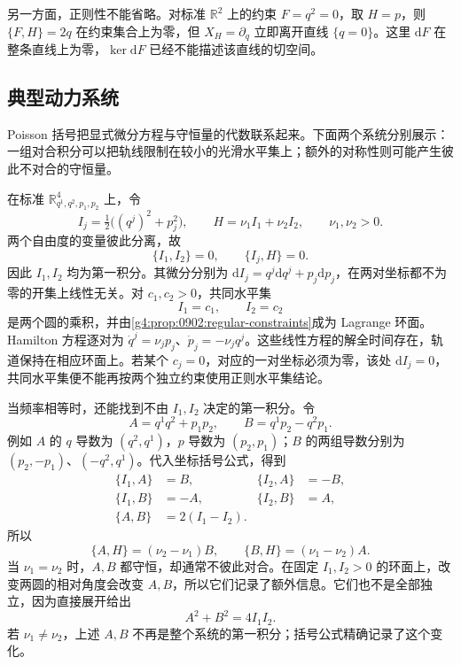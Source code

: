 \ProseParagraphBreak

另一方面，正则性不能省略。对标准 \(\mathbb R^2\) 上的约束 \(F=q^2=0\)，取 \(H=p\)，则 \(\{F,H\}=2q\) 在约束集合上为零，但 \(X_H=\partial_q\) 立即离开直线 \(\{q=0\}\)。这里 \(\mathrm{d}F\) 在整条直线上为零，\(\ker\mathrm{d}F\) 已经不能描述该直线的切空间。

\subsection{典型动力系统}
\label{g4:subsec:0902:04}

Poisson 括号把显式微分方程与守恒量的代数联系起来。下面两个系统分别展示：一组对合积分可以把轨线限制在较小的光滑水平集上；额外的对称性则可能产生彼此不对合的守恒量。

\begin{example}\label{g4:exm:0902:two-oscillators}
	在标准 \(\mathbb R^4_{q^1,q^2,p_1,p_2}\) 上，令
	\[
		I_j=\tfrac12\bigl((q^j)^2+p_j^2\bigr),\qquad
		H=\nu_1I_1+\nu_2I_2,\qquad \nu_1,\nu_2>0.
	\]
	两个自由度的变量彼此分离，故
	\[
		\{I_1,I_2\}=0,\qquad \{I_j,H\}=0.
	\]
	因此 \(I_1,I_2\) 均为第一积分。其微分分别为
	\(\mathrm{d}I_j=q^j\mathrm{d}q^j+p_j\mathrm{d}p_j\)，在两对坐标都不为零的开集上线性无关。对 \(c_1,c_2>0\)，共同水平集
	\[
		I_1=c_1,\qquad I_2=c_2
	\]
	是两个圆的乘积，并由\cref{g4:prop:0902:regular-constraints}成为 Lagrange 环面。Hamilton 方程逐对为
	\(\dot q^j=\nu_jp_j\)、\(\dot p_j=-\nu_jq^j\)。这些线性方程的解全时间存在，轨道保持在相应环面上。若某个 \(c_j=0\)，对应的一对坐标必须为零，该处 \(\mathrm{d}I_j=0\)，共同水平集便不能再按两个独立约束使用正则水平集结论。

	当频率相等时，还能找到不由 \(I_1,I_2\) 决定的第一积分。令
	\[
		A=q^1q^2+p_1p_2,\qquad
		B=q^1p_2-q^2p_1.
	\]
	例如 \(A\) 的 \(q\) 导数为 \((q^2,q^1)\)，\(p\) 导数为 \((p_2,p_1)\)；\(B\) 的两组导数分别为 \((p_2,-p_1)\)、\((-q^2,q^1)\)。代入坐标括号公式，得到
	\begin{equation}\label{g4:eq:0902:oscillator-brackets}
		\begin{aligned}
			\{I_1,A\}&=B,& \{I_2,A\}&=-B,\\
			\{I_1,B\}&=-A,& \{I_2,B\}&=A,\\
			\{A,B\}&=2(I_1-I_2).
		\end{aligned}
	\end{equation}
	所以
	\[
		\{A,H\}=(\nu_2-\nu_1)B,\qquad
		\{B,H\}=(\nu_1-\nu_2)A.
	\]
	当 \(\nu_1=\nu_2\) 时，\(A,B\) 都守恒，却通常不彼此对合。在固定 \(I_1,I_2>0\) 的环面上，改变两圆的相对角度会改变 \(A,B\)，所以它们记录了额外信息。它们也不是全部独立，因为直接展开给出
	\[
		A^2+B^2=4I_1I_2.
	\]
	若 \(\nu_1\ne\nu_2\)，上述 \(A,B\) 不再是整个系统的第一积分；括号公式精确记录了这个变化。
\end{example}

